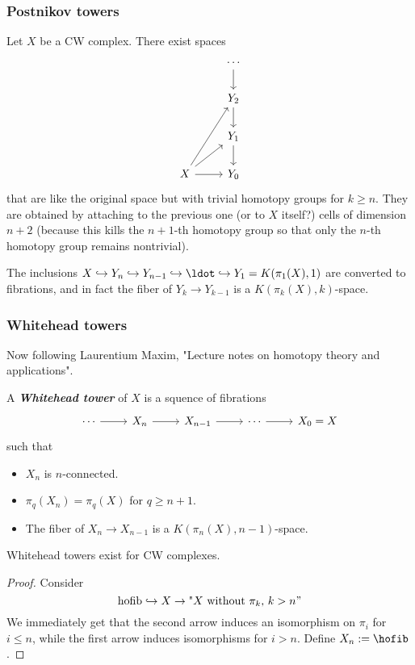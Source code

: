 \begin{remark}
\subsubsection{Postnikov towers}
Let $X$ be a CW complex. There exist spaces
$$\begin{tikzcd}
	&\cdots\arrow[d]\\
	&Y_{2}\arrow[d]\\
	&Y_{1}\arrow[d]\\
	X\arrow[uur]\arrow[ur]\arrow[r]&Y_{0}
\end{tikzcd}$$
that are like the original space but with trivial homotopy groups for $k\geq n$. They are obtained by attaching to the previous one {\color{blue}(or to $X$ itself?)} cells of dimension $n+2$ (because this kills the $n+1$-th homotopy group so that only the $n$-th homotopy group remains nontrivial).

The inclusions $X\hookrightarrow Y_{n}\hookrightarrow Y_{n-1}\hookrightarrow \ldot\hookrightarrow Y_{1}=K(\pi_{1}(X),1)$ are converted to fibrations, and in fact the fiber of $Y_{k}\to Y_{k-1}$ is a $K(\pi_{k}(X),k)$-space.

\subsubsection{Whitehead towers}

Now following Laurentium Maxim, "Lecture notes on homotopy theory and applications".

\begin{definition}
	A \textit{\textbf{Whitehead tower}} of $X$ is a squence of fibrations
	$$\begin{tikzcd}
		\cdots \arrow[r]&X_{n}\arrow[r]&X_{n-1}\arrow[r]&\cdots \arrow[r]&X_{0}=X
	\end{tikzcd}$$
	such that
	\begin{itemize}
		\item $X_n$ is $n$-connected.
		\item $\pi_{q}(X_{n})=\pi_{q}(X)$ for $q\geq n+1$.
		\item The fiber of $X_n\to  X_{n-1}$ is a $K(\pi_{n}(X),n-1)$-space.
	\end{itemize}
\end{definition}
\begin{lemma}
	Whitehead towers exist for CW complexes.
\end{lemma}
\begin{proof}
	Consider
	$$\text{hofib}\hookrightarrow X\to \text{"$X$ without $\pi_{k}$, $k>n$}"$$
	We immediately get that the second arrow induces an isomorphism on $\pi_{i}$ for $i\leq n$, while the first arrow induces isomorphisms for $i>n$. Define $ X_{n}:=\hofib$.


\end{proof}
\end{remark}

